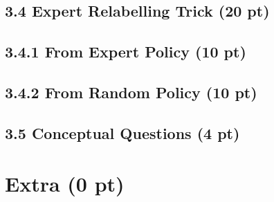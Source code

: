 \documentclass[12pt]{article}
\begin{document}
\begin{tcolorbox}[fit,height=22em, width=40em, blank, borderline={1pt}{1pt},nobeforeafter]
\begin{center}

\end{center}
\end{tcolorbox}




\subsection*{3.4 Expert Relabelling Trick (20 pt)}
\subsection*{3.4.1 From Expert Policy (10 pt)}

\begin{tcolorbox}[fit,height=22em, width=40em, blank, borderline={1pt}{1pt},nobeforeafter]
\begin{center}

\end{center}
\end{tcolorbox}


\subsection*{3.4.2 From Random Policy (10 pt)}

\begin{tcolorbox}[fit,height=50em, width=40em, blank, borderline={1pt}{1pt},nobeforeafter]
\begin{center}

\end{center}
\end{tcolorbox}


\subsection*{3.5 Conceptual Questions (4 pt)}

\begin{tcolorbox}[fit,height=22em, width=40em, blank, borderline={1pt}{1pt},nobeforeafter]
\begin{center}

\end{center}
\end{tcolorbox}

\section*{Extra (0 pt)}
\end{document}
